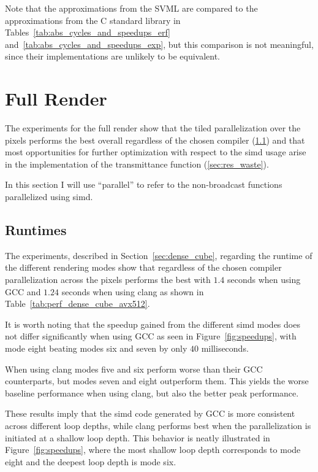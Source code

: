 \documentclass[a4paper, 11pt]{memoir}
\begin{document}
    Note that the approximations from the SVML are compared to the approximations from the C standard library in
    Tables~\ref{tab:abs_cycles_and_speedups_erf} and~\ref{tab:abs_cycles_and_speedups_exp}, but this comparison is not
    meaningful, since their implementations are unlikely to be equivalent.

    \section{Full Render}
    \label{sec:res_full_render}
    The experiments for the full render show that the tiled parallelization over the pixels performs the best overall
    regardless of the chosen compiler (\ref{sec:res_runtimes}) and that most opportunities for further optimization
    with respect to the \gls{simd} usage arise in the implementation of the transmittance function (\ref{sec:res_waste}).

    In this section I will use \enquote{parallel} to refer to the non-broadcast functions parallelized using \gls{simd}.

    \subsection{Runtimes}
    \label{sec:res_runtimes}
    The experiments, described in Section~\ref{sec:dense_cube}, regarding the runtime of the different rendering modes
    show that regardless of the chosen compiler parallelization across the pixels performs the best with $1.4$ seconds
    when using GCC and $1.24$ seconds when using clang as shown in Table~\ref{tab:perf_dense_cube_avx512}.

    It is worth noting that the speedup gained from the different \gls{simd} modes does not differ significantly when using
    GCC as seen in Figure~\ref{fig:speedups}, with mode eight beating modes six and seven by only $40$ milliseconds.

    When using clang modes five and six perform worse than their GCC counterparts, but modes seven and eight outperform
    them. This yields the worse baseline performance when using clang, but also the better peak performance.

    These results imply that the \gls{simd} code generated by GCC is more consistent across different loop depths, while
    clang performs best when the parallelization is initiated at a shallow loop depth. This behavior is neatly illustrated
    in Figure~\ref{fig:speedups}, where the most shallow loop depth corresponds to mode eight and the deepest loop depth
    is mode six.
\end{document}
